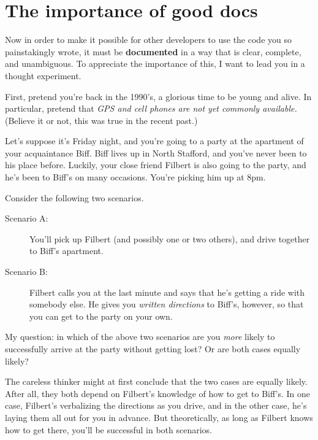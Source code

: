 \section{The importance of good docs}

Now in order to make it possible for other developers to use the code you so
painstakingly wrote, it must be \textbf{documented} in a way that is clear,
complete, and unambiguous. To appreciate the importance of this, I want to
lead you in a thought experiment.

First, pretend you're back in the 1990's, a glorious time to be young and
alive. In particular, pretend that \textit{GPS and cell phones are not yet
commonly available.} (Believe it or not, this was true in the recent past.)

Let's suppose it's Friday night, and you're going to a party at the apartment
of your acquaintance Biff. Biff lives up in North Stafford, and you've never
been to his place before. Luckily, your close friend Filbert is also going to
the party, and he's been to Biff's on many occasions. You're picking him up at
8pm.

Consider the following two scenarios.

\begin{description}

\item[Scenario A:] You'll pick up Filbert (and possibly one or two others), and
drive together to Biff's apartment.

\item[Scenario B:] Filbert calls you at the last minute and says that he's
getting a ride with somebody else. He gives you \textit{written directions} to
Biff's, however, so that you can get to the party on your own.

\end{description}

My question: in which of the above two scenarios are you \textit{more} likely
to successfully arrive at the party without getting lost? Or are both cases
equally likely?

The careless thinker might at first conclude that the two cases are equally
likely. After all, they both depend on Filbert's knowledge of how to get to
Biff's. In one case, Filbert's verbalizing the directions as you drive, and in
the other case, he's laying them all out for you in advance. But
theoretically, as long as Filbert knows how to get there, you'll be successful
in both scenarios.

